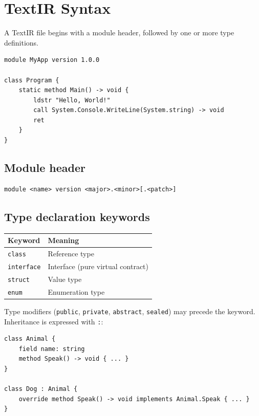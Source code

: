 \documentclass[11pt,a4paper]{article}
\begin{document}
\section{TextIR Syntax}
\label{sec:textir}

A TextIR file begins with a module header, followed by one or more type
definitions.

\begin{lstlisting}[language=TextIR,caption={Minimal TextIR module}]
module MyApp version 1.0.0

class Program {
    static method Main() -> void {
        ldstr "Hello, World!"
        call System.Console.WriteLine(System.string) -> void
        ret
    }
}
\end{lstlisting}

\subsection{Module header}
\begin{lstlisting}[language=TextIR]
module <name> version <major>.<minor>[.<patch>]
\end{lstlisting}

\subsection{Type declaration keywords}
\begin{center}
\begin{tabular}{ll}
\toprule
\textbf{Keyword} & \textbf{Meaning} \\
\midrule
\texttt{class}     & Reference type \\
\texttt{interface} & Interface (pure virtual contract) \\
\texttt{struct}    & Value type \\
\texttt{enum}      & Enumeration type \\
\bottomrule
\end{tabular}
\end{center}

Type modifiers (\texttt{public}, \texttt{private}, \texttt{abstract},
\texttt{sealed}) may precede the keyword.  Inheritance is expressed with
\texttt{:}:

\begin{lstlisting}[language=TextIR]
class Animal {
    field name: string
    method Speak() -> void { ... }
}

class Dog : Animal {
    override method Speak() -> void implements Animal.Speak { ... }
}
\end{lstlisting}
\end{document}

